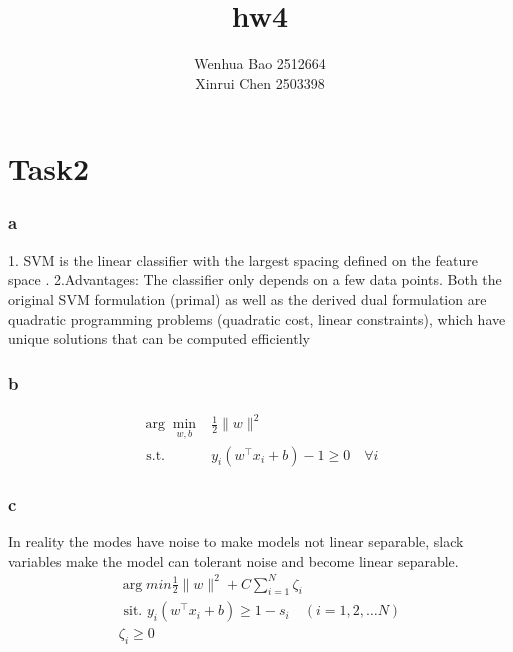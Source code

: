 \documentclass{article}
\title{hw4}
\author{Wenhua Bao 2512664\\Xinrui Chen 2503398}
\begin{document}
\maketitle

\section{Task2}
\subsubsection{a}
1. SVM is the linear classifier with the largest spacing defined on the feature space .
2.Advantages: The classifier only depends on a few data points.
              Both the original SVM formulation (primal) as well as the
              derived dual formulation are quadratic programming problems
              (quadratic cost, linear constraints), which have unique solutions
              that can be computed efficiently
\subsubsection{b}
$$\begin{aligned}
\arg \min _{w, b} & \frac{1}{2}\|w\|^{2} \\
\text { s.t. } & y_{i}\left(w^{\top} x_{i}+b\right)-1 \geqslant 0 \quad \forall i
\end{aligned}$$
\subsubsection{c}
In reality the modes have noise to make models not linear separable, slack variables make the model can tolerant noise and become linear separable.
$$\begin{array}{l}
\arg min \frac{1}{2}\|w\|^{2}+C \sum_{i=1}^{N} \zeta_{i} \\
\text { sit. } y_{i}\left(w^{\top} x_{i}+b\right) \geqslant 1-s_{i} \quad(i=1,2, \ldots N) \\
\zeta_{i} \geqslant 0
\end{array}$$
\end{document}

